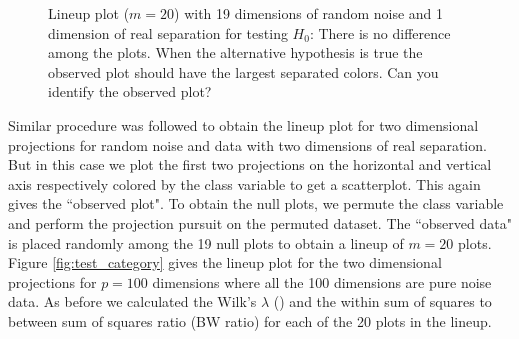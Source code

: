 \documentclass[12]{article}
\begin{document}
%
\begin{figure}[hbtp]
   \centering
       \caption{Lineup plot ($m=20$) with 19 dimensions of random noise  and 1 dimension of real separation for testing $H_0$: There is no difference among the plots. When the alternative hypothesis is true the observed plot should have the largest separated colors. Can you identify the observed plot?}
     \label{fig:test_category_1d}
\end{figure}
%
%

Similar procedure was followed to obtain the lineup plot for two dimensional projections for random noise and data with two dimensions of real separation. But in this case we plot the first two projections on the horizontal and vertical axis respectively colored by the class variable to get a scatterplot. This again gives the ``observed plot". To obtain the null plots, we permute the class variable and perform the projection pursuit on the permuted dataset. The ``observed data" is placed randomly among the 19 null plots to obtain a lineup of $m = 20$ plots. Figure \ref{fig:test_category} gives the lineup plot for the two dimensional projections for $p =100$ dimensions where all the 100 dimensions are pure noise data. As before we calculated the Wilk's $\lambda$ (\cite{JW02})  and the within sum of squares to between sum of squares ratio (BW ratio) for each of the 20 plots in the lineup. 
 
\end{document}
